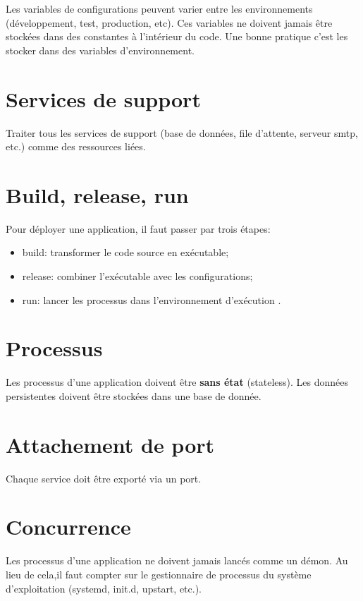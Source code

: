 Les variables de configurations peuvent varier entre les environnements (développement, test, production, etc). Ces variables ne doivent jamais être stockées dans des constantes à l'intérieur du code. Une bonne pratique c'est les stocker dans des variables d'environnement.

\section*{Services de support}

Traiter tous les services de support (base de données, file d'attente, serveur \acrshort{smtp}, etc.)  comme des ressources liées.

\section*{Build, release, run}

Pour déployer une application, il faut passer par trois étapes:
\begin{itemize}
	\item build: transformer le code source en exécutable;
	\item release: combiner l'exécutable avec les configurations;
	\item run: lancer les processus dans l'environnement d'exécution .
\end{itemize}


\section*{Processus}

Les processus d'une application doivent être \textbf{sans état} (stateless). Les données persistentes doivent être stockées dans une base de donnée.

\section*{Attachement de port}

Chaque service doit être exporté via un port.

\section*{Concurrence}

Les processus d'une application ne doivent jamais lancés comme un démon. Au lieu de cela,il faut compter sur le gestionnaire de processus du système d'exploitation (systemd, init.d, upstart, etc.).

